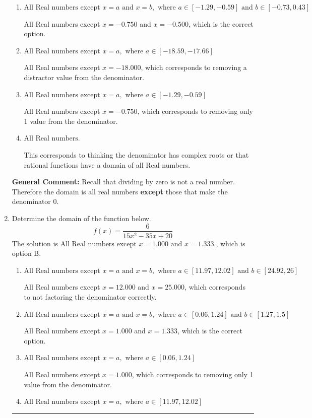 \documentclass{extbook}[14pt]
\newcommand{\litem}[1]{\item #1

\rule{\textwidth}{0.4pt}}
\begin{document}
\begin{enumerate}
{\begin{enumerate}[label=\Alph*.]
All Real numbers except $x = -18.000$ and $x = -12.000$, which corresponds to not factoring the denominator correctly.
\item \( \text{All Real numbers except } x = a \text{ and } x = b, \text{ where } a \in [-1.29, -0.59] \text{ and } b \in [-0.73, 0.43] \)

All Real numbers except $x = -0.750$ and $x = -0.500$, which is the correct option.
\item \( \text{All Real numbers except } x = a, \text{ where } a \in [-18.59, -17.66] \)

All Real numbers except $x = -18.000$, which corresponds to removing a distractor value from the denominator.
\item \( \text{All Real numbers except } x = a, \text{ where } a \in [-1.29, -0.59] \)

All Real numbers except $x = -0.750$, which corresponds to removing only 1 value from the denominator.
\item \( \text{All Real numbers.} \)

This corresponds to thinking the denominator has complex roots or that rational functions have a domain of all Real numbers.
\end{enumerate}

\textbf{General Comment:} Recall that dividing by zero is not a real number. Therefore the domain is all real numbers \textbf{except} those that make the denominator 0.
}
\litem{
Determine the domain of the function below.
\[ f(x) = \frac{6}{15x^{2} -35 x + 20} \]The solution is \( \text{All Real numbers except } x = 1.000 \text{ and } x = 1.333. \), which is option B.\begin{enumerate}[label=\Alph*.]
\item \( \text{All Real numbers except } x = a \text{ and } x = b, \text{ where } a \in [11.97, 12.02] \text{ and } b \in [24.92, 26] \)

All Real numbers except $x = 12.000$ and $x = 25.000$, which corresponds to not factoring the denominator correctly.
\item \( \text{All Real numbers except } x = a \text{ and } x = b, \text{ where } a \in [0.06, 1.24] \text{ and } b \in [1.27, 1.5] \)

All Real numbers except $x = 1.000$ and $x = 1.333$, which is the correct option.
\item \( \text{All Real numbers except } x = a, \text{ where } a \in [0.06, 1.24] \)

All Real numbers except $x = 1.000$, which corresponds to removing only 1 value from the denominator.
\item \( \text{All Real numbers except } x = a, \text{ where } a \in [11.97, 12.02] \)


\end{enumerate}}
\end{enumerate}
\end{document}
